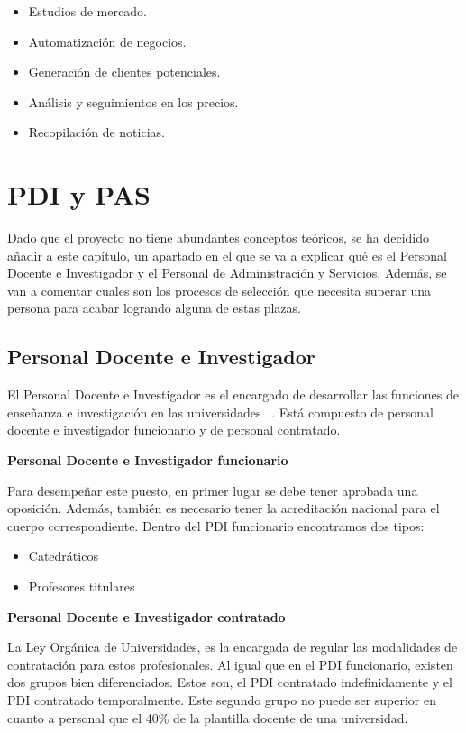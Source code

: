\begin{itemize}
    \item Estudios de mercado.
    \item Automatización de negocios.
    \item Generación de clientes potenciales.
    \item Análisis y seguimientos en los precios.
    \item Recopilación de noticias.
\end{itemize}

\section{PDI y PAS}

Dado que el proyecto no tiene abundantes conceptos teóricos, se ha decidido añadir a este capítulo, un apartado en el que se va a explicar qué es el Personal Docente e Investigador y el Personal de Administración y Servicios. Además, se van a comentar cuales son los procesos de selección que necesita superar una persona para acabar logrando alguna de estas plazas.

\subsection{Personal Docente e Investigador}
El Personal Docente e Investigador es el encargado de desarrollar las funciones de enseñanza e investigación en las universidades ~\cite{raepdi:latex}. Está compuesto de personal docente e investigador funcionario y de personal contratado.

\textbf{Personal Docente e Investigador funcionario}

Para desempeñar este puesto, en primer lugar se debe tener aprobada una oposición. Además, también es necesario tener la acreditación nacional para el cuerpo correspondiente. Dentro del PDI funcionario encontramos dos tipos:

\begin{itemize}
    \item Catedráticos
    \item Profesores titulares
\end{itemize}

\textbf{Personal Docente e Investigador contratado}

La Ley Orgánica de Universidades, es la encargada de regular las modalidades de contratación para estos profesionales. Al igual que en el PDI funcionario, existen dos grupos bien diferenciados. Estos son, el PDI contratado indefinidamente y el PDI contratado temporalmente. Este segundo grupo no puede ser superior en cuanto a personal que el 40\% de la plantilla docente de una universidad.

